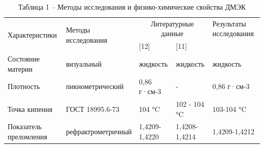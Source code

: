 \begin{table}[H]
\caption*{Таблица 1 -- Методы исследования и физико-химические свойства ДМЭК}
\centering
\begin{tabular}{|l|l|ll|p{}|}
\hline
\multirow{2}{*}{Характеристики} & \multirow{2}{*}{Методы исследования} & \multicolumn{2}{c|}{Литературные данные}           & Результаты исследования \\ \cline{3-5} 
                  &                  & \multicolumn{1}{l|}{{[}12{]}}    & {[}11{]}     &             \\ \hline
Состояние материи & визуальный       & \multicolumn{1}{l|}{жидкость}    & жидкость     & жидкость    \\ \hline
Плотность         & пикнометрический & \multicolumn{1}{l|}{0,86 г·см-3} & -            & 0,86 г·см-3 \\ \hline
Точка кипения     & ГОСТ 18995.6-73  & \multicolumn{1}{l|}{104 °C}      & 102 - 104 °C & 103-104 °C  \\ \hline
Показатель преломления          & рефрактрометричный                   & \multicolumn{1}{l|}{1,4209-1,4220} & 1,4208-1,4214 & 1,4209-1,4212           \\ \hline
\end{tabular}
\end{table}

